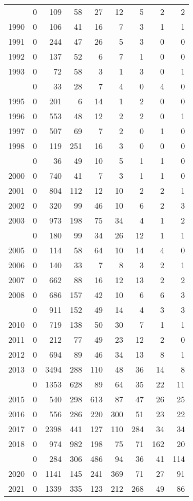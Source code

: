 \documentclass[
]{article}
\begin{document}
\begin{longtable}[t]{lrrrrrrrr}
\endfoot
\bottomrule
\endlastfoot
1989 & 0 & 109 & 58 & 27 & 12 & 5 & 2 & 2\\
1990 & 0 & 106 & 41 & 16 & 7 & 3 & 1 & 1\\
1991 & 0 & 244 & 47 & 26 & 5 & 3 & 0 & 0\\
1992 & 0 & 137 & 52 & 6 & 7 & 1 & 0 & 0\\
1993 & 0 & 72 & 58 & 3 & 1 & 3 & 0 & 1\\
\addlinespace
1994 & 0 & 33 & 28 & 7 & 4 & 0 & 4 & 0\\
1995 & 0 & 201 & 6 & 14 & 1 & 2 & 0 & 0\\
1996 & 0 & 553 & 48 & 12 & 2 & 2 & 0 & 1\\
1997 & 0 & 507 & 69 & 7 & 2 & 0 & 1 & 0\\
1998 & 0 & 119 & 251 & 16 & 3 & 0 & 0 & 0\\
\addlinespace
1999 & 0 & 36 & 49 & 10 & 5 & 1 & 1 & 0\\
2000 & 0 & 740 & 41 & 7 & 3 & 1 & 1 & 0\\
2001 & 0 & 804 & 112 & 12 & 10 & 2 & 2 & 1\\
2002 & 0 & 320 & 99 & 46 & 10 & 6 & 2 & 3\\
2003 & 0 & 973 & 198 & 75 & 34 & 4 & 1 & 2\\
\addlinespace
2004 & 0 & 180 & 99 & 34 & 26 & 12 & 1 & 1\\
2005 & 0 & 114 & 58 & 64 & 10 & 14 & 4 & 0\\
2006 & 0 & 140 & 33 & 7 & 8 & 3 & 2 & 1\\
2007 & 0 & 662 & 88 & 16 & 12 & 13 & 2 & 2\\
2008 & 0 & 686 & 157 & 42 & 10 & 6 & 6 & 3\\
\addlinespace
2009 & 0 & 911 & 152 & 49 & 14 & 4 & 3 & 3\\
2010 & 0 & 719 & 138 & 50 & 30 & 7 & 1 & 1\\
2011 & 0 & 212 & 77 & 49 & 23 & 12 & 2 & 0\\
2012 & 0 & 694 & 89 & 46 & 34 & 13 & 8 & 1\\
2013 & 0 & 3494 & 288 & 110 & 48 & 36 & 14 & 8\\
\addlinespace
2014 & 0 & 1353 & 628 & 89 & 64 & 35 & 22 & 11\\
2015 & 0 & 540 & 298 & 613 & 87 & 47 & 26 & 25\\
2016 & 0 & 556 & 286 & 220 & 300 & 51 & 23 & 22\\
2017 & 0 & 2398 & 441 & 127 & 110 & 284 & 34 & 34\\
2018 & 0 & 974 & 982 & 198 & 75 & 71 & 162 & 20\\
\addlinespace
2019 & 0 & 284 & 306 & 486 & 94 & 36 & 41 & 114\\
2020 & 0 & 1141 & 145 & 241 & 369 & 71 & 27 & 91\\
2021 & 0 & 1339 & 335 & 123 & 212 & 268 & 49 & 86\\*
\end{longtable}
\end{document}

